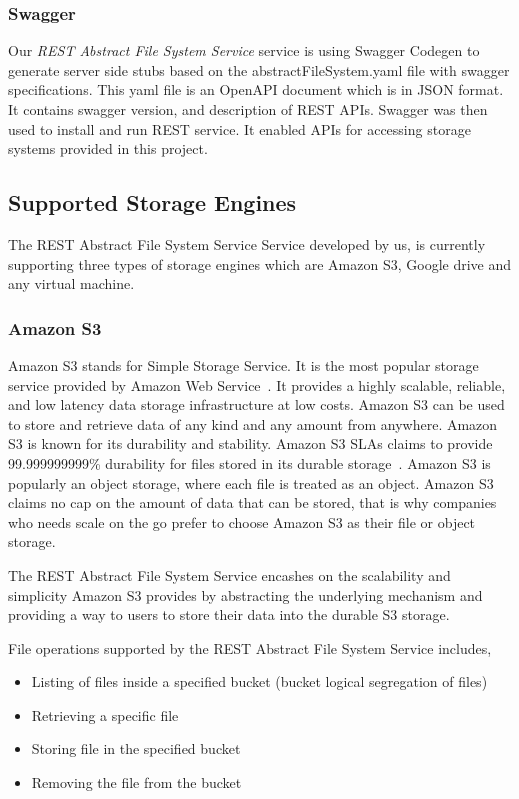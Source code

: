 \subsubsection{Swagger}

Our \emph{REST Abstract File System Service} service is using Swagger Codegen
to generate server side stubs based on the abstractFileSystem.yaml
file with swagger specifications.  This yaml file is an OpenAPI
document which is in JSON format.  It contains swagger version, and
description of REST APIs.  Swagger was then used to install and run
REST service. It enabled APIs for accessing storage systems provided
in this project.

\subsection{Supported Storage Engines}

The REST Abstract File System Service Service developed by us, is currently
supporting three types of storage engines which are Amazon S3, Google
drive and any virtual machine. 

\subsubsection{Amazon S3}


Amazon S3 stands for Simple Storage Service. It is the most popular
storage service provided by Amazon Web
Service~\cite{hid-sp18-420-amazon-S3}. It provides a highly scalable,
reliable, and low latency data storage infrastructure at low
costs. Amazon S3 can be used to store and retrieve data of any kind
and any amount from anywhere. Amazon S3 is known for its durability
and stability. Amazon S3 SLAs claims to provide 99.999999999\%
durability for files stored in its durable
storage~\cite{hid-sp18-420-amazon-S3}. Amazon S3 is popularly an
object storage, where each file is treated as an object. Amazon S3
claims no cap on the amount of data that can be stored, that is why
companies who needs scale on the go prefer to choose Amazon S3 as
their file or object storage.

The REST Abstract File System Service encashes on the scalability and
simplicity Amazon S3 provides by abstracting the underlying mechanism
and providing a way to users to store their data into the durable S3
storage.

File operations supported by the REST Abstract File System Service
includes,

\begin{itemize}
\item Listing of files inside a specified bucket (bucket logical
  segregation of files)
\item Retrieving a specific file
\item Storing file in the specified bucket
\item Removing the file from the bucket
\end{itemize}



